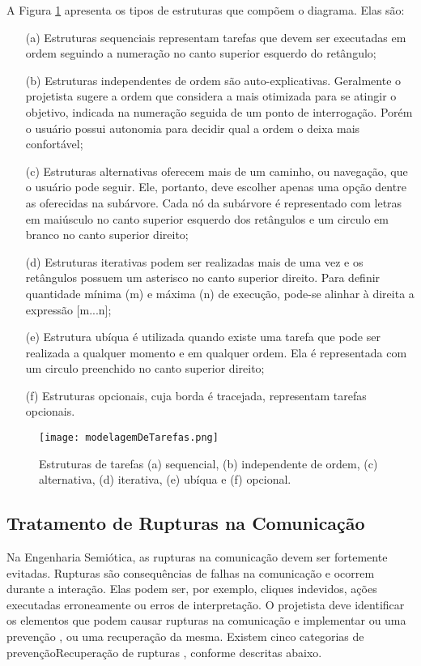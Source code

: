 \indent A Figura \ref{fig:modelagemDeTarefas} apresenta os tipos de estruturas que compõem o diagrama. Elas são:

\begin{itemize}
\item [(a)] Estruturas sequenciais representam tarefas que devem ser executadas em ordem seguindo a numeração no canto superior esquerdo do retângulo;
\item [(b)] Estruturas independentes de ordem são auto-explicativas. Geralmente o projetista sugere a ordem que considera a mais otimizada para se atingir o objetivo, indicada na numeração seguida de um ponto de interrogação. Porém o usuário possui autonomia para decidir qual a ordem o deixa mais confortável;
\item [(c)] Estruturas alternativas oferecem mais de um caminho, ou navegação, que o usuário pode seguir. Ele, portanto, deve escolher apenas uma opção dentre as oferecidas na subárvore. Cada nó da subárvore é representado com letras em maiúsculo no canto superior esquerdo dos retângulos e um circulo em branco no canto superior direito;
\item [(d)] Estruturas iterativas podem ser realizadas mais de uma vez e os retângulos possuem um asterisco no canto superior direito. Para definir quantidade mínima (m) e máxima (n) de execução, pode-se alinhar à direita a expressão [m...n]; 
\item [(e)] Estrutura ubíqua é utilizada quando existe uma tarefa que pode ser realizada a qualquer momento e em qualquer ordem. Ela é representada com um circulo preenchido no canto superior direito;
\item [(f)] Estruturas opcionais, cuja borda é tracejada, representam tarefas opcionais.
\end{itemize}
  

\begin{figure}[!h]
    \centering
    \texttt{[image: modelagemDeTarefas.png]}
    \caption{Estruturas de tarefas (a) sequencial, (b) independente de ordem, (c) alternativa, (d) iterativa, (e) ubíqua e (f) opcional.}
    \label{fig:modelagemDeTarefas}
\end{figure} 

\subsection{Tratamento de Rupturas na Comunicação}

\indent Na Engenharia Semiótica, as rupturas na comunicação devem ser fortemente evitadas. Rupturas são consequências de falhas na comunicação e ocorrem durante a interação. Elas podem ser, por exemplo, cliques indevidos, ações executadas erroneamente ou erros de interpretação. O projetista deve identificar os elementos que podem causar rupturas na comunicação e implementar ou uma prevenção , ou uma recuperação da mesma. Existem cinco categorias de prevenção\/Recuperação de rupturas \cite{IHCbook}, conforme descritas abaixo.

